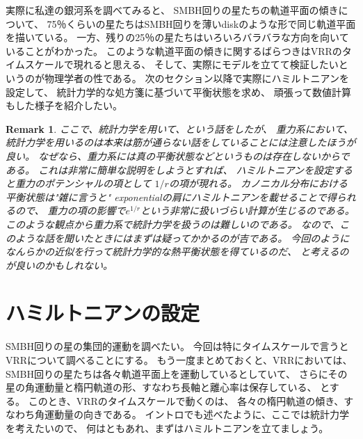 \documentclass[10pt, pre, twocolumn, showpacs, aps]{revtex4-1}
\newtheorem{remark}{Remark}
\begin{document}
実際に私達の銀河系を調べてみると、
SMBH回りの星たちの軌道平面の傾きについて、
75％くらいの星たちはSMBH回りを薄いdiskのような形で同じ軌道平面を描いている。
一方、残りの25％の星たちはいろいろバラバラな方向を向いていることがわかった。
このような軌道平面の傾きに関するばらつきはVRRのタイムスケールで現れると思える、
そして、実際にモデルを立てて検証したいというのが物理学者の性である。
次のセクション以降で実際にハミルトニアンを設定して、
統計力学的な処方箋に基づいて平衡状態を求め、
頑張って数値計算もした様子を紹介したい。

\begin{remark}
ここで、統計力学を用いて、という話をしたが、
重力系において、統計力学を用いるのは本来は筋が通らない話をしていることには注意したほうが良い。
なぜなら、重力系には真の平衡状態などというものは存在しないからである。
これは非常に簡単な説明をしようとすれば、
ハミルトニアンを設定すると重力のポテンシャルの項として
$1/r$の項が現れる。
カノニカル分布における平衡状態は"雑に言うと"
exponentialの肩にハミルトニアンを載せることで得られるので、
重力の項の影響で$e^{1/r}$という非常に扱いづらい計算が生じるのである。
このような観点から重力系で統計力学を扱うのは難しいのである。
なので、このような話を聞いたときにはまずは疑ってかかるのが吉である。
今回のようになんらかの近似を行って統計力学的な熱平衡状態を得ているのだ、
と考えるのが良いのかもしれない。	
\end{remark}

\section{ハミルトニアンの設定}
SMBH回りの星の集団的運動を調べたい。
今回は特にタイムスケールで言うとVRRについて調べることにする。
もう一度まとめておくと、VRRにおいては、
SMBH回りの星たちは各々軌道平面上を運動しているとしていて、
さらにその星の角運動量と楕円軌道の形、すなわち長軸と離心率は保存している、
とする。
このとき、VRRのタイムスケールで動くのは、
各々の楕円軌道の傾き、すなわち角運動量の向きである。
イントロでも述べたように、ここでは統計力学を考えたいので、
何はともあれ、まずはハミルトニアンを立てましょう。
\end{document}
